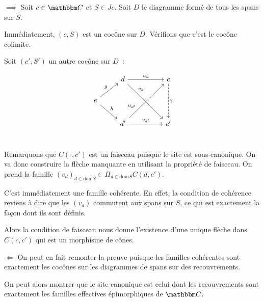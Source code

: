 \begin{pv}
    $\boxed{\implies}$ Soit $c\in \C$ et $S\in Jc$. Soit $D$ le diagramme formé
    de tous les spans sur $S$.

    Immédiatement, $(c,S)$ est un cocône sur $D$. Vérifions que c'est le cocône
    colimite.

    Soit $(c',S')$ un autre cocône sur $D$~:

    \[\begin{tikzcd}
        & d \arrow[rr, "u_d"] \arrow[rrdd, near start, "v_d"]
            & & c \arrow[dd, dashed, "?"] \\
        e \arrow[ru, "g"] \arrow[rd, "h"] & & & \\
        & d' \arrow[rruu, near start, "u_{d'}"] \arrow[rr, "v_{d'}"] & & c' \\
    \end{tikzcd}\]

    Remarquons que $C(\cdot, c')$ est un faisceau puisque le site est sous-canonique. On
    va donc construire la flèche manquante en utilisant la propriété de faisceau.
    On prend la famille $(v_d)_{d\in\text{dom}S}\in \Pi_{d\in\text{dom}S} C(d,c')$.
    
    C'est immédiatement une famille cohérente. En effet, la condition de cohérence
    reviens à dire que les $(v_d)$ commutent aux spans sur $S$, ce qui est exactement
    la façon dont ils sont définis.

    Alors la condition de faisceau nous donne l'existence d'une unique flèche dans
    $C(c,c')$ qui est un morphisme de cônes.

    $\boxed{\Longleftarrow}$ On peut en fait remonter la preuve puisque les familles 
    cohérentes sont exactement les cocônes sur les diagrammes de spans sur des
    recouvrements.
\end{pv}

\begin{cor}\label{caracCanon}
    On peut alors montrer que le site canonique est celui dont les recouvrements sont
    exactement les familles effectives épimorphiques de $\C$.
\end{cor}

